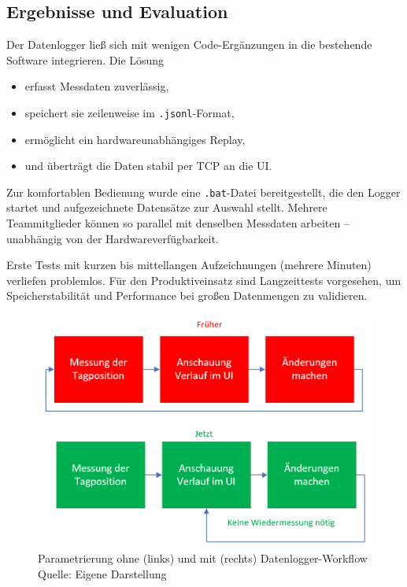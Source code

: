\documentclass[a4paper, 12pt]{article} %
\begin{document}
\subsection{Ergebnisse und Evaluation}
Der Datenlogger ließ sich mit wenigen Code-Ergänzungen in die bestehende Software integrieren.  
Die Lösung

\begin{itemize}[leftmargin=2em]
  \item erfasst Messdaten zuverlässig,
  \item speichert sie zeilenweise im \texttt{.jsonl}-Format,
  \item ermöglicht ein hardwareunabhängiges Replay,
  \item und überträgt die Daten stabil per \ac{TCP} an die \ac{UI}.
\end{itemize}

Zur komfortablen Bedienung wurde eine \texttt{.bat}-Datei bereitgestellt, die den Logger startet und aufgezeichnete Datensätze zur Auswahl stellt.  
Mehrere Teammitglieder können so parallel mit denselben Messdaten arbeiten – unabhängig von der Hardwareverfügbarkeit.

Erste Tests mit kurzen bis mittellangen Aufzeichnungen (mehrere Minuten) verliefen problemlos.  
Für den Produktiveinsatz sind Langzeittests vorgesehen, um Speicherstabilität und Performance bei großen Datenmengen zu validieren.

\begin{figure}[H]
    \centering
    \includegraphics[width=\linewidth]{images/Vergleich Parametrisierung.png}
    \caption{Parametrierung ohne (links) und mit (rechts) Datenlogger-Workflow\\
            Quelle: Eigene Darstellung}
    \label{fig:parameter_comparison}
\end{figure}
\end{document}
